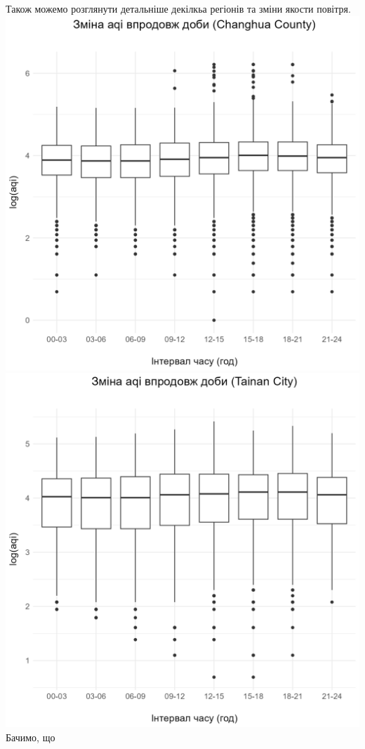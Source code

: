 \documentclass{article}
\begin{document}
\begin{enumerate}
    Також можемо розглянути детальніше декілкьа регіонів та зміни якости повітря. 
    \includegraphics[width=6in]{question3/county-box/Changhua County.png}
    \includegraphics[width=6in]{question3/county-box/Tainan City.png}
    Бачимо, що 


\end{enumerate}
\end{document}
